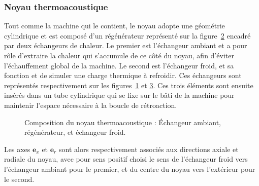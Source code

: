 \subsubsection{Noyau thermoacoustique}
Tout comme la machine qui le contient, le noyau adopte une géométrie cylindrique et est composé d'un régénérateur représenté sur la figure~\ref{fig:TacotPhotos_Regen} encadré par deux échangeurs de chaleur. Le premier est l'échangeur ambiant et a pour rôle d'extraire la chaleur qui s'accumule de ce côté du noyau, afin d'éviter l'échauffement global de la machine. Le second est l'échangeur froid, et sa fonction et de simuler une charge thermique à refroidir. Ces échangeurs sont représentés respectivement sur les figures~\ref{fig:TacotPhotos_AHX} et \ref{fig:TacotPhotos_CHX}. Ces trois éléments sont ensuite insérés dans un tube cylindrique qui se fixe sur le bâti de la machine pour maintenir l'espace nécessaire à la boucle de rétroaction.

\begin{figure}[!ht]
    \centering
	\begin{subfigure}{.32\textwidth}
		\centering
		\caption{}
		\label{fig:TacotPhotos_AHX}
	\end{subfigure}		
	\begin{subfigure}{.32\textwidth}
		\centering
		\caption{}
		\label{fig:TacotPhotos_Regen}
	\end{subfigure}	
	\begin{subfigure}{.32\textwidth}
		\centering
		\caption{}
		\label{fig:TacotPhotos_CHX}
	\end{subfigure}	    
    \caption{Composition du noyau thermoacoustique :  \'Echangeur ambiant,  régénérateur, et  échangeur froid.}
    \label{fig:TacotPhotos}
\end{figure}


Les axes $\mathbf e_x$ et $\mathbf e_r$ sont alors respectivement associés aux directions axiale et radiale du noyau,  avec pour sens positif choisi le sens de l'échangeur froid vers l'échangeur ambiant pour le premier, et du centre du noyau vers l'extérieur pour le second.\medskip

